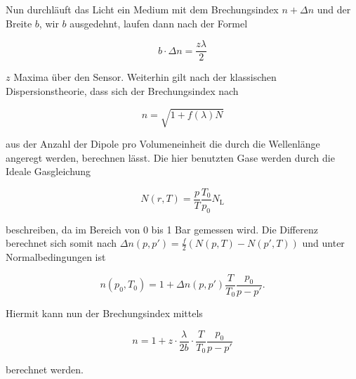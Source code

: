         \noindent Nun durchläuft das Licht ein Medium mit dem Brechungsindex $n+\Delta n $ und der Breite $b$, wir $b$ ausgedehnt, laufen 
        dann nach der Formel

        \begin{equation}
            b \cdot \Delta n = \frac{z \lambda}{2}    \nonumber 
        \end{equation}

        \noindent $z$ Maxima über den Sensor. Weiterhin gilt nach der klassischen Dispersionstheorie, dass sich der Brechungsindex nach 
        
        \begin{equation}
            n = \sqrt{1 + f(\lambda) N}    \nonumber 
        \end{equation}

        \noindent aus der Anzahl der Dipole pro Volumeneinheit die durch die Wellenlänge angeregt werden, berechnen lässt. Die hier benutzten 
        Gase werden durch die Ideale Gasgleichung 
        
        \begin{equation}
            N(r,T) = \frac{p}{T} \frac{T_0}{p_0} N_{\text{L}}    \nonumber 
        \end{equation}

        \noindent beschreiben, da im Bereich von 0 bis 1 Bar gemessen wird. Die Differenz berechnet sich somit nach 
        $\Delta n(p,p') = \frac{f}{2}(N(p,T)-N(p',T))$ und unter Normalbedingungen ist 

        \begin{equation}
            n(p_0, T_0) = 1 + \Delta n(p,p') \frac{T}{T_0} \frac{p_0}{p-p'}.    \nonumber 
        \end{equation}

        \noindent Hiermit kann nun der Brechungsindex mittels 

        \begin{equation}
            n = 1 + z \cdot \frac{\lambda}{2b} \cdot \frac{T}{T_0} \frac{p_0}{p - p'}    \nonumber 
        \end{equation}

        \noindent berechnet werden.